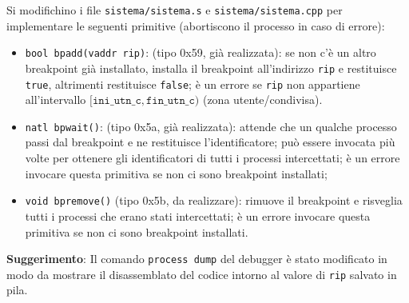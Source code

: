 Si modifichino i file \verb|sistema/sistema.s| e \verb|sistema/sistema.cpp| per implementare le seguenti primitive
(abortiscono il processo in caso di errore):
\begin{itemize}
\item 	\verb|bool bpadd(vaddr rip)|: (tipo 0x59, gi\`a realizzata): se non c'\`e un altro breakpoint gi\`a installato,
	installa il breakpoint all'indirizzo \verb|rip| e restituisce \verb|true|, altrimenti restituisce \verb|false|;
        \`e un errore se \verb|rip| non appartiene all'intervallo $[\mathtt{ini\_utn\_c}, \mathtt{fin\_utn\_c})$ (zona utente/condivisa).
\item   \verb|natl bpwait()|: (tipo 0x5a, gi\`a realizzata): attende che un qualche processo passi dal breakpoint e ne restituisce
	l'identificatore; pu\`o essere invocata pi\`u volte per ottenere gli identificatori di tutti i processi intercettati;
	\`e un errore invocare questa primitiva se non ci sono breakpoint installati;
\item   \verb|void bpremove()| (tipo 0x5b, da realizzare): rimuove il breakpoint e risveglia tutti i processi che erano stati intercettati;
	\`e un errore invocare questa primitiva se non ci sono breakpoint installati.
\end{itemize}

{\bf Suggerimento}: Il comando \verb|process dump| del debugger \`e stato modificato in modo da mostrare il disassemblato del codice
intorno al valore di \verb|rip| salvato in pila.
